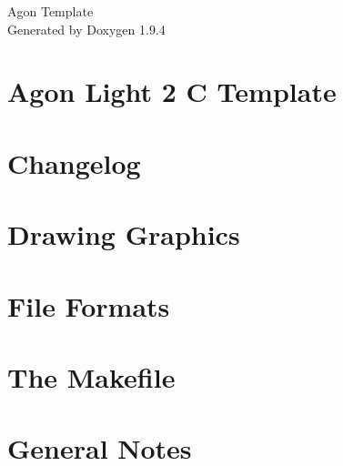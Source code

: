 \documentclass[twoside]{book}
\newcommand{\+}{\discretionary{\mbox{\scriptsize$\hookleftarrow$}}{}{}}
\newcommand{\clearemptydoublepage}{%
    \newpage{\pagestyle{empty}\cleardoublepage}%
  }
\begin{document}
  \raggedbottom
    \hypersetup{pageanchor=false,
                bookmarksnumbered=true,
                pdfencoding=unicode
               }
  \begin{titlepage}
  \vspace*{7cm}
  \begin{center}%
  {\Large Agon Template}\\
  \vspace*{1cm}
  {\large Generated by Doxygen 1.9.4}\\
  \end{center}
  \end{titlepage}
  \clearemptydoublepage
  \tableofcontents
  \clearemptydoublepage
  \hypersetup{pageanchor=true}
\chapter{Agon Light 2 C Template}
\label{index}\hypertarget{index}{}
\chapter{Changelog}
\label{md__changelog}

\chapter{Drawing Graphics}
\label{md_docs_pages_drawing_graphics}

\chapter{File Formats}
\label{md_docs_pages_file_format}

\chapter{The Makefile}
\label{md_docs_pages_makefile}

\chapter{General Notes}
\label{md_docs_pages_notes}

\end{document}
